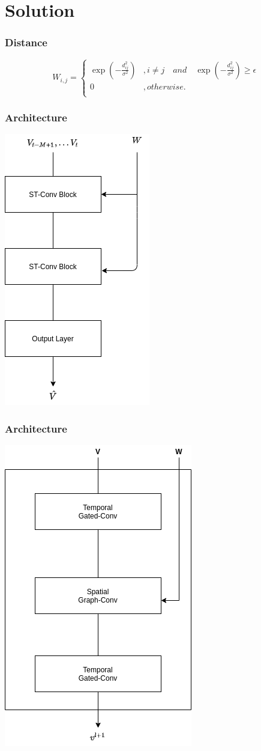 \documentclass{beamer}
\begin{document}
\section{Solution}

\begin{frame}
  \frametitle{Distance}
  \begin{equation}
    W_{i,j} = \left\{
      \begin{array}{ll}
        \exp(-\frac{d^{2}_{ij}}{\sigma^{2}}) & , i \neq j \quad and \quad \exp(-\frac{d^{2}_{ij}}{\sigma^{2}}) \geq \epsilon \\
        0 & , otherwise. \\
      \end{array}\right.
    \label{eq:distance}
  \end{equation}
\end{frame}
\begin{frame}
  \frametitle{Architecture}
  \centering
  \includegraphics[height=\textheight]{img/blocks.png}
\end{frame}
\begin{frame}
  \frametitle{Architecture}
  \centering
  \includegraphics[height=\textheight]{img/inner-blocks.png}
\end{frame}
\end{document}
